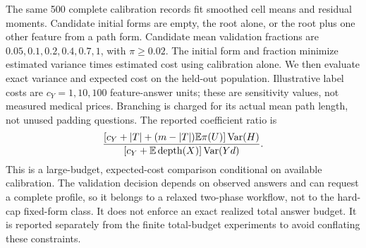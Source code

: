 The same 500 complete calibration records fit smoothed cell means and
residual moments. Candidate initial forms are empty, the root alone, or
the root plus one other feature from a path form. Candidate mean validation
fractions are $0.05,0.1,0.2,0.4,0.7,1$, with $\pi\ge0.02$.
The initial form and fraction minimize estimated variance times estimated
cost using calibration alone. We then evaluate exact variance and expected
cost on the held-out population. Illustrative label costs are
$c_Y=1,10,100$ feature-answer units; these are sensitivity values, not
measured medical prices. Branching is charged for its actual mean path
length, not unused padding questions. The reported coefficient ratio is
\[
 \frac{[c_Y+|T|+(m-|T|)\mathbb{E}\pi(U)]\operatorname{Var}(H)}
      {[c_Y+\mathbb{E}\operatorname{depth}(X)]\operatorname{Var}(Yd)}.
\]
This is a large-budget, expected-cost comparison conditional on available
calibration. The validation decision depends on observed answers and can
request a complete profile, so it belongs to a relaxed two-phase workflow,
not to the hard-cap fixed-form class. It does not enforce an exact realized
total answer budget. It is reported separately from the finite
total-budget experiments to avoid conflating these constraints.


